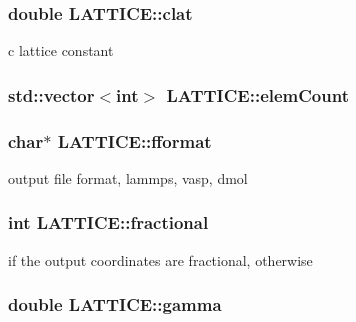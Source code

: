 \subsubsection[{clat}]{\setlength{\rightskip}{0pt plus 5cm}double L\+A\+T\+T\+I\+C\+E\+::clat}\label{class_l_a_t_t_i_c_e_aae495a347749c2380c73ecb89b955f3d}


c lattice constant 

\hypertarget{class_l_a_t_t_i_c_e_a63bb555fee4e3cc086f0826437aa5af8}{}
\subsubsection[{elem\+Count}]{\setlength{\rightskip}{0pt plus 5cm}std\+::vector$<$int$>$ L\+A\+T\+T\+I\+C\+E\+::elem\+Count}\label{class_l_a_t_t_i_c_e_a63bb555fee4e3cc086f0826437aa5af8}
\hypertarget{class_l_a_t_t_i_c_e_ac1c63af3a896cf4d443347cd202698f7}{}
\subsubsection[{fformat}]{\setlength{\rightskip}{0pt plus 5cm}char$\ast$ L\+A\+T\+T\+I\+C\+E\+::fformat}\label{class_l_a_t_t_i_c_e_ac1c63af3a896cf4d443347cd202698f7}


output file format, lammps, vasp, dmol 

\hypertarget{class_l_a_t_t_i_c_e_a922caeabeb80ebdc3c899b64eaf527ac}{}
\subsubsection[{fractional}]{\setlength{\rightskip}{0pt plus 5cm}int L\+A\+T\+T\+I\+C\+E\+::fractional}\label{class_l_a_t_t_i_c_e_a922caeabeb80ebdc3c899b64eaf527ac}


{} if the output coordinates are fractional, {} otherwise 

\hypertarget{class_l_a_t_t_i_c_e_a5a4c56af589d9fa6639025ef72e8fac2}{}
\subsubsection[{gamma}]{\setlength{\rightskip}{0pt plus 5cm}double L\+A\+T\+T\+I\+C\+E\+::gamma}\label{class_l_a_t_t_i_c_e_a5a4c56af589d9fa6639025ef72e8fac2}


